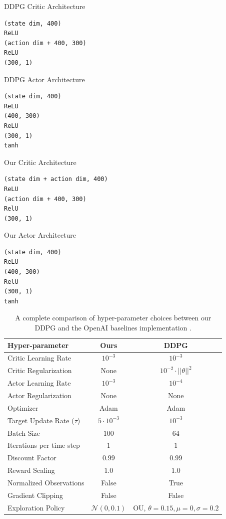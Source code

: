 \documentclass{article}
\newcommand{\N}{\mathcal{N}}
\begin{document}
DDPG Critic Architecture
\begin{verbatim}
(state dim, 400)
ReLU
(action dim + 400, 300)
ReLU
(300, 1)
\end{verbatim}
DDPG Actor Architecture
\begin{verbatim}
(state dim, 400)
ReLU
(400, 300)
ReLU
(300, 1)
tanh
\end{verbatim}

Our Critic Architecture
\begin{verbatim}
(state dim + action dim, 400)
ReLU
(action dim + 400, 300)
RelU
(300, 1)
\end{verbatim}
Our Actor Architecture
\begin{verbatim}
(state dim, 400)
ReLU
(400, 300)
RelU
(300, 1)
tanh
\end{verbatim}

\begin{table}
\centering
\caption{A complete comparison of hyper-parameter choices between our DDPG and the OpenAI baselines implementation \cite{baselines}.}
\begin{center}
\begin{small}
\begin{tabular}{lcc}
\toprule
\bf{Hyper-parameter} & \bf{Ours} & \bf{DDPG} \\
\midrule
Critic Learning Rate & $10^{-3}$ & $10^{-3}$ \\
Critic Regularization & None & $10^{-2} \cdot ||\theta||^2$ \\
Actor Learning Rate & $10^{-3}$ & $10^{-4}$ \\
Actor Regularization & None & None \\
Optimizer & Adam & Adam \\
Target Update Rate ($\tau$) & $5 \cdot 10^{-3}$ & $10^{-3}$ \\ 
Batch Size & $100$ & $64$ \\ 
Iterations per time step & $1$ & $1$ \\
Discount Factor & $0.99$ & $0.99$ \\
Reward Scaling & $1.0$ & $1.0$ \\
Normalized Observations & False & True \\
Gradient Clipping & False & False \\
Exploration Policy & $\N(0, 0.1)$ & OU, $\theta=0.15, \mu=0, \sigma=0.2$ \\ 
\bottomrule
\end{tabular}
\end{small}
\end{center}
\end{table}
\end{document}
